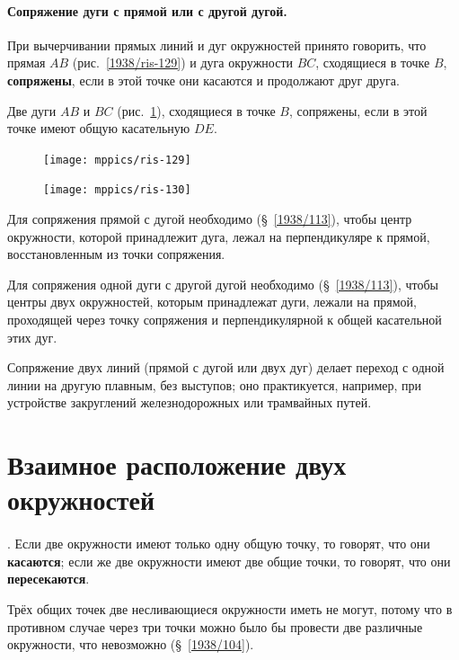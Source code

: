 \documentclass[oneside]{book}
\begin{document}
\paragraph{Сопряжение дуги с прямой или с другой дугой.}\label{1938/116}
При вычерчивании прямых линий и дуг окружностей принято говорить, что прямая $AB$ (рис.~\ref{1938/ris-129}) и дуга окружности $BC$, сходящиеся в точке $B$, \textbf{сопряжены}, если в этой точке они касаются и продолжают друг друга. 

Две дуги $AB$ и $BC$ (рис.~\ref{1938/ris-130}), сходящиеся в точке $B$, сопряжены, если в этой точке имеют общую касательную $DE$.

\begin{figure}
\centering
\texttt{[image: mppics/ris-129]}
\caption{}\label{1938/ris-129}
\bigskip
\texttt{[image: mppics/ris-130]}
\caption{}\label{1938/ris-130}
\end{figure}

Для сопряжения прямой с дугой необходимо (§~\ref{1938/113}), чтобы центр окружности, которой принадлежит дуга, лежал на перпендикуляре к прямой, восстановленным из точки сопряжения.

Для сопряжения одной дуги с другой дугой необходимо (§~\ref{1938/113}), чтобы центры двух окружностей, которым принадлежат дуги, лежали на прямой, проходящей через точку сопряжения и перпендикулярной к общей касательной этих дуг.

Сопряжение двух линий (прямой с дугой или двух дуг) делает переход с одной линии на другую плавным, без выступов;
оно практикуется, например, при устройстве закруглений железнодорожных или трамвайных путей.

\section{Взаимное расположение двух окружностей}

\paragraph{}\label{1938/117}
.
Если две окружности имеют только одну общую точку, то говорят, что они \textbf{касаются};
если же две окружности имеют две общие точки, то говорят, что они \textbf{пересекаются}.

Трёх общих точек две несливающиеся окружности иметь не могут, потому что в противном случае через три точки можно было бы провести две различные окружности, что невозможно (§~\ref{1938/104}).
\end{document}
